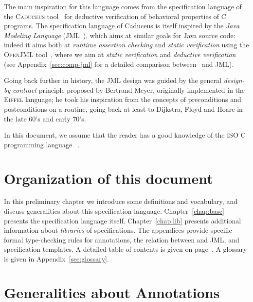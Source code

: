 
The main inspiration for this language comes from the
specification language of the \textsc{Caduceus}
tool~\cite{filliatre04icfem,filliatre07cav} for deductive verification
of behavioral properties of C programs. The specification language of
Caduceus is itself inspired by the
\emph{Java Modeling Language} (JML~\cite{leavens00jml}), which aims at
similar goals for Java source code: indeed it aims both at
\emph{runtime assertion checking} and \emph{static verification} using
the \textsc{OpenJML} tool~\cite{Cok-2011-OpenJML,Cok-2014-OpenJML}, where we aim at
\emph{static verification} and \emph{deductive verification} (see
Appendix~\ref{sec:comp-jml} for a detailed comparison between \NAME~and
JML).

Going back further in history, the JML design was guided by the general
\emph{design-by-contract} principle proposed by Bertrand Meyer,
originally implemented in
the \textsc{Eiffel} language;
he took his inspiration from the concepts of preconditions and
postconditions on a routine, going back at least to Dijkstra, Floyd and
Hoare in the late 60's and early 70's.

In this document, we assume that the reader has a good knowledge of
the ISO C programming language~\cite{KR88,standardc99} 
.

\section{Organization of this document}

In this preliminary chapter we introduce some definitions and
vocabulary, and discuss generalities about this specification
language.  Chapter~\ref{chap:base} presents the specification language
itself.  Chapter~\ref{chap:lib} presents additional information about
\emph{libraries} of specifications. The appendices provide
specific formal type-checking rules for \NAME{} annotations, 
the relation between \NAME{} and JML, and specification templates.
A detailed table of
contents is given on page~\pageref{chap:contents}.
A glossary is given in Appendix~\ref{sec:glossary}.

\section{Generalities about Annotations}\label{sec:gener-about-annot}

